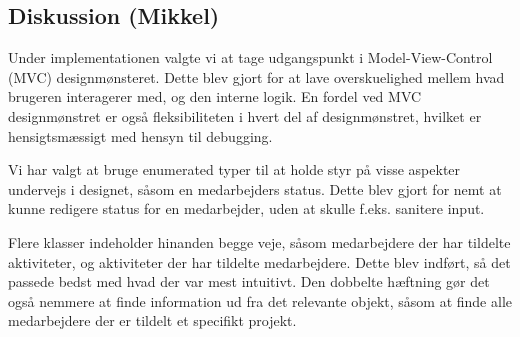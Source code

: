 \subsection{Diskussion (Mikkel)}

Under implementationen valgte vi at tage udgangspunkt i Model-View-Control (MVC) designmønsteret. Dette blev gjort for at lave overskuelighed mellem hvad brugeren interagerer med, og den interne logik. En fordel ved MVC designmønstret er også fleksibiliteten i hvert del af designmønstret, hvilket er hensigtsmæssigt med hensyn til debugging. 

Vi har valgt at bruge enumerated typer til at holde styr på visse aspekter undervejs i designet, såsom en medarbejders status. Dette blev gjort for nemt at kunne redigere status for en medarbejder, uden at skulle f.eks. sanitere input.

Flere klasser indeholder hinanden begge veje, såsom medarbejdere der har tildelte aktiviteter, og aktiviteter der har tildelte medarbejdere. Dette blev indført, så det passede bedst med hvad der var mest intuitivt. Den dobbelte hæftning gør det også nemmere at finde information ud fra det relevante objekt, såsom at finde alle medarbejdere der er tildelt et specifikt projekt.